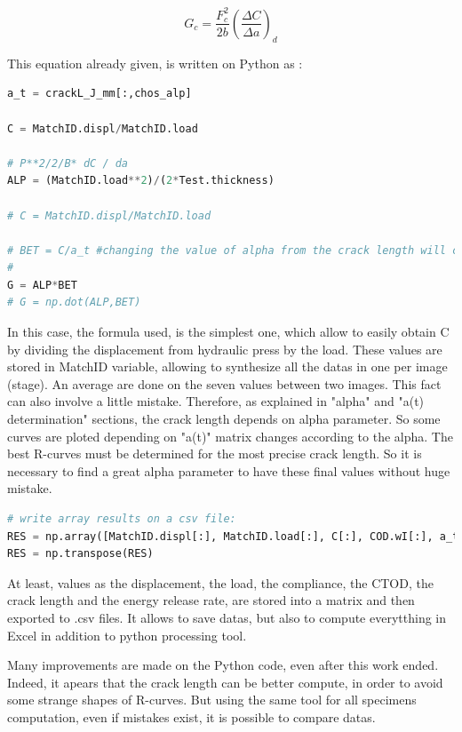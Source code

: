 \begin{equation}
	G_{c}= \frac{F_{c}^2}{2b} (\frac{\Delta C}{\Delta a})_{d} 	
	\label{eq:Energy release rate equation}
\end{equation}

This equation already given, is written on Python as :

\begin{lstlisting}[language=Python]
a_t = crackL_J_mm[:,chos_alp]

C = MatchID.displ/MatchID.load

# P**2/2/B* dC / da
ALP = (MatchID.load**2)/(2*Test.thickness)

# C = MatchID.displ/MatchID.load

# BET = C/a_t #changing the value of alpha from the crack length will change G values
#
G = ALP*BET
# G = np.dot(ALP,BET)
\end{lstlisting}

In this case, the formula used, is the simplest one, which allow to easily obtain C by dividing the displacement from hydraulic press by the load. These values are stored in MatchID variable, allowing to synthesize all the datas in one per image (stage). An average are done on the seven values between two images. This fact can also involve a little mistake.
Therefore, as explained in "alpha" and "a(t) determination" sections, the crack length depends on alpha parameter. So some curves are ploted depending on "a(t)" matrix changes according to the alpha. The best R-curves must be determined for the most precise crack length. So it is necessary to find a great alpha parameter to have these final values without huge mistake.

\begin{lstlisting}[language=Python]
# write array results on a csv file:
RES = np.array([MatchID.displ[:], MatchID.load[:], C[:], COD.wI[:], a_t[:], G[:]])
RES = np.transpose(RES)
\end{lstlisting}

At least, values as the displacement, the load, the compliance, the CTOD, the crack length and the energy release rate, are stored into a matrix and then exported to .csv files. It allows to save datas, but also to compute everytthing in Excel in addition to python processing tool.

Many improvements are made on the Python code, even after this work ended. Indeed, it apears that the crack length can be better compute, in order to avoid some strange shapes of R-curves. But using the same tool for all specimens computation, even if mistakes exist, it is possible to compare datas.

